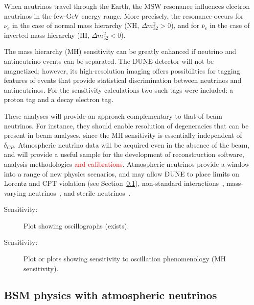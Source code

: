 When neutrinos travel through the Earth, the MSW resonance influences 
electron neutrinos in the few-GeV energy range. More precisely, the resonance 
occurs for $\nu_e$ in the case of normal mass hierarchy (NH, $\Delta m^2_{32} > 0$), and for 
$\overline{\nu}_e$ in the case of inverted mass hierarchy (IH, $\Delta m^2_{32} < 0$).

The mass hierarchy (MH) sensitivity can be greatly enhanced if neutrino and antineutrino events can be 
separated. The DUNE detector will not be magnetized; however, its high-resolution 
imaging offers possibilities for tagging features of events that provide statistical 
discrimination between neutrinos and antineutrinos. For the sensitivity calculations 
two such tags were included: a proton tag and a decay electron tag. 

These analyses will provide an approach complementary to that of beam neutrinos. 
For instance, they should enable resolution of 
degeneracies that can be present in beam analyses, since %
the MH sensitivity is essentially independent of $\delta_{CP}$.   Atmospheric neutrino data will be acquired 
even in the absence of the beam, and will provide a useful sample for the development of 
reconstruction software, analysis methodologies \textcolor{red}{and calibrations}.  
Atmospheric neutrinos provide a window into a range of new physics scenarios, and %
may allow DUNE to place limits on Lorentz and CPT violation (see Section~\ref{sec:nonaccel-atm-bsm}), 
non-standard interactions~\cite{Chatterjee:2014gxa}, mass-varying neutrinos~\cite{Abe:2008zza}, and
sterile neutrinos~\cite{Abe:2014gda}.


\begin{description}
\item[Sensitivity:] Plot showing oscillographs (exists). 
\item[Sensitivity:] Plot or plots showing sensitivity to oscillation phenomenology (MH sensitivity). 
\end{description}


\subsection{BSM physics with atmospheric neutrinos}
\label{sec:nonaccel-atm-bsm}


